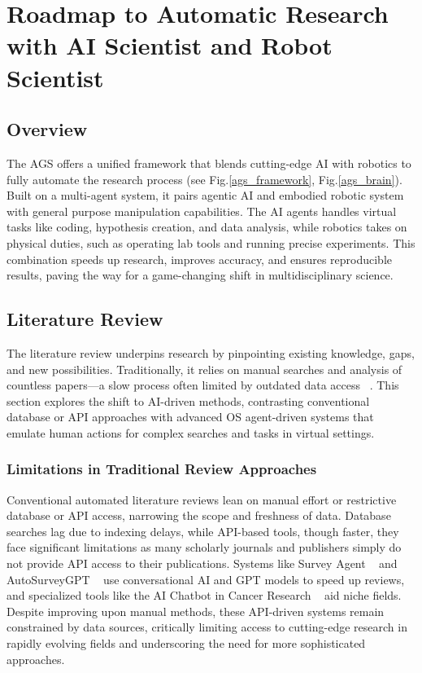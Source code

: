 \section*{Roadmap to Automatic Research with AI Scientist and Robot Scientist}

\subsection*{Overview}

The AGS offers a unified framework that blends cutting-edge AI with robotics to fully automate the research process (see Fig.\ref{ags_framework}, Fig.\ref{ags_brain}). Built on a multi-agent system, it pairs agentic AI and embodied robotic system with general purpose manipulation capabilities. The AI agents handles virtual tasks like coding, hypothesis creation, and data analysis, while robotics takes on physical duties, such as operating lab tools and running precise experiments. This combination speeds up research, improves accuracy, and ensures reproducible results, paving the way for a game-changing shift in multidisciplinary science.


\subsection*{Literature Review}

The literature review underpins research by pinpointing existing knowledge, gaps, and new possibilities. Traditionally, it relies on manual searches and analysis of countless papers—a slow process often limited by outdated data access ~\cite{wagner2022artificial}. This section explores the shift to AI-driven methods, contrasting conventional database or API approaches with advanced OS agent-driven systems that emulate human actions for complex searches and tasks in virtual settings.

\subsubsection*{Limitations in Traditional Review Approaches}

Conventional automated literature reviews lean on manual effort or restrictive database or API access, narrowing the scope and freshness of data. Database searches lag due to indexing delays, while API-based tools, though faster, they face significant limitations as many scholarly journals and publishers simply do not provide API access to their publications. Systems like Survey Agent ~\cite{wang2024surveyagent} and AutoSurveyGPT ~\cite{xiao2023autosurveygpt} use conversational AI and GPT models to speed up reviews, and specialized tools like the AI Chatbot in Cancer Research ~\cite{pan2023assessment} aid niche fields.  Despite improving upon manual methods, these API-driven systems remain constrained by data sources, critically limiting access to cutting-edge research in rapidly evolving fields and underscoring the need for more sophisticated approaches.

